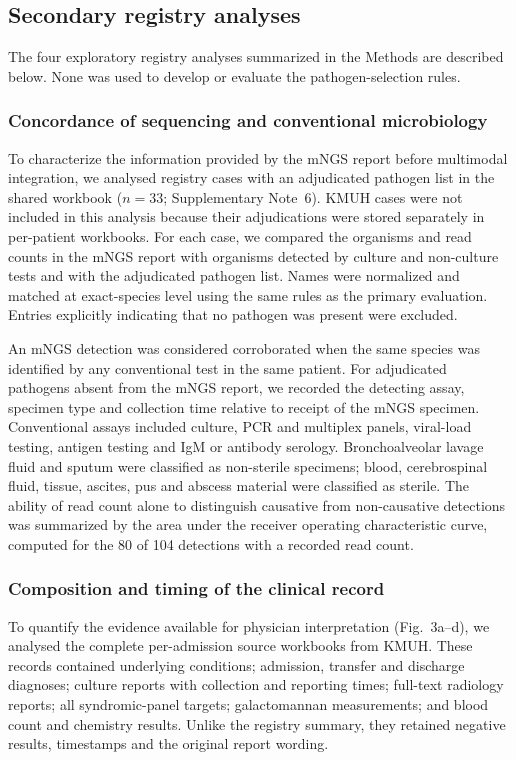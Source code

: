 \documentclass[11pt,a4paper]{article}
\newcommand{\mngs}{mNGS\xspace}
\newcommand{\kmuh}{KMUH\xspace}
\begin{document}
\subsection*{Secondary registry analyses}
The four exploratory registry analyses summarized in the Methods are described below. None was used to develop or evaluate the pathogen-selection rules.

\subsubsection*{Concordance of sequencing and conventional microbiology}
To characterize the information provided by the \mngs report before multimodal integration, we analysed registry cases with an adjudicated pathogen list in the shared workbook ($n=33$; Supplementary Note~6). \kmuh cases were not included in this analysis because their adjudications were stored separately in per-patient workbooks. For each case, we compared the organisms and read counts in the \mngs report with organisms detected by culture and non-culture tests and with the adjudicated pathogen list. Names were normalized and matched at exact-species level using the same rules as the primary evaluation. Entries explicitly indicating that no pathogen was present were excluded.

An \mngs detection was considered corroborated when the same species was identified by any conventional test in the same patient. For adjudicated pathogens absent from the \mngs report, we recorded the detecting assay, specimen type and collection time relative to receipt of the \mngs specimen. Conventional assays included culture, PCR and multiplex panels, viral-load testing, antigen testing and IgM or antibody serology. Bronchoalveolar lavage fluid and sputum were classified as non-sterile specimens; blood, cerebrospinal fluid, tissue, ascites, pus and abscess material were classified as sterile. The ability of read count alone to distinguish causative from non-causative detections was summarized by the area under the receiver operating characteristic curve, computed for the 80 of 104 detections with a recorded read count.

\subsubsection*{Composition and timing of the clinical record}
To quantify the evidence available for physician interpretation (Fig.~3a--d), we analysed the complete per-admission source workbooks from \kmuh. These records contained underlying conditions; admission, transfer and discharge diagnoses; culture reports with collection and reporting times; full-text radiology reports; all syndromic-panel targets; galactomannan measurements; and blood count and chemistry results. Unlike the registry summary, they retained negative results, timestamps and the original report wording.
\end{document}
